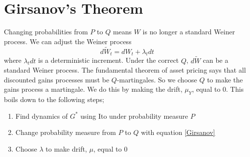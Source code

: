
\section{Girsanov's Theorem}

Changing probabilities from $P$ to $Q$ means $W$ is no longer a standard Weiner
process. We can adjust the Weiner process
\begin{equation} \label{Girsanov}
    d\tilde{W}_t=dW_t+\lambda_tdt
\end{equation}
where $\lambda_tdt$ is a deterministic increment. Under the correct $Q$,
$d\tilde{W}$ can be a standard Weiner process.
The fundamental theorem of asset pricing says that all discounted gains
processes must be $Q$-martingales. So we choose $Q$ to make the gains process
a martingale. We do this by making the drift, $\mu_Y$, equal to $0$. This boils
down to the following steps;
\begin{enumerate}
    \item Find dynamics of $G^*$ using Ito under probability measure $P$
    \item Change probability measure from $P$ to $Q$ with equation
          \ref{Girsanov}
    \item Choose $\lambda$ to make drift, $\mu$, equal to $0$
\end{enumerate}
